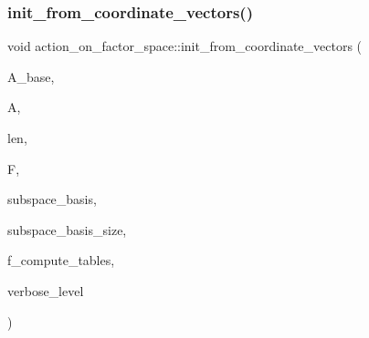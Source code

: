 \subsubsection{\texorpdfstring{init\+\_\+from\+\_\+coordinate\+\_\+vectors()}{init\_from\_coordinate\_vectors()}}
{\footnotesize\ttfamily void action\+\_\+on\+\_\+factor\+\_\+space\+::init\+\_\+from\+\_\+coordinate\+\_\+vectors (\begin{DoxyParamCaption}\item[{\mbox{\hyperlink{classaction}{action}} \&}]{A\+\_\+base,  }\item[{\mbox{\hyperlink{classaction}{action}} \&}]{A,  }\item[{\mbox{\hyperlink{galois_8h_a09fddde158a3a20bd2dcadb609de11dc}{I\+NT}}}]{len,  }\item[{\mbox{\hyperlink{classfinite__field}{finite\+\_\+field}} $\ast$}]{F,  }\item[{\mbox{\hyperlink{galois_8h_a09fddde158a3a20bd2dcadb609de11dc}{I\+NT}} $\ast$}]{subspace\+\_\+basis,  }\item[{\mbox{\hyperlink{galois_8h_a09fddde158a3a20bd2dcadb609de11dc}{I\+NT}}}]{subspace\+\_\+basis\+\_\+size,  }\item[{\mbox{\hyperlink{galois_8h_a09fddde158a3a20bd2dcadb609de11dc}{I\+NT}}}]{f\+\_\+compute\+\_\+tables,  }\item[{\mbox{\hyperlink{galois_8h_a09fddde158a3a20bd2dcadb609de11dc}{I\+NT}}}]{verbose\+\_\+level }\end{DoxyParamCaption})}

\mbox{\label{classaction__on__factor__space_a3094fd6f1ed3d0428e5db510669e2d8a}} 
